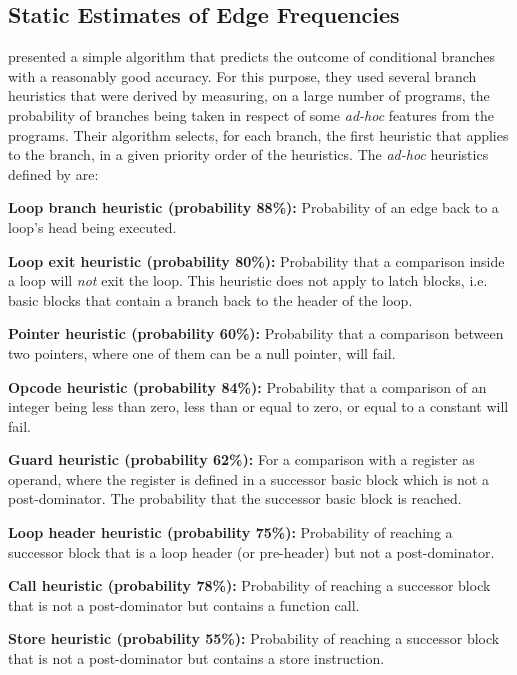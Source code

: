 \subsection{Static Estimates of Edge Frequencies}

\cite{ball93} presented a simple algorithm that predicts the outcome of conditional branches with a reasonably good accuracy.
For this purpose, they used several branch heuristics that were derived by measuring, on a large number of programs, the probability of branches being taken in respect of some \textit{ad-hoc} features from the programs.
Their algorithm selects, for each branch, the first heuristic that applies to the branch, in a given priority order of the heuristics.
The \textit{ad-hoc} heuristics defined by \cite{ball93} are:

\noindent\textbf{Loop branch heuristic (probability 88\%):} Probability of an edge back to a loop's head being executed.

\noindent\textbf{Loop exit heuristic (probability 80\%):} Probability that a comparison inside a loop will \textit{not} exit the loop. This heuristic does not apply to latch blocks, i.e. basic blocks that contain a branch back to the header of the loop.

\noindent\textbf{Pointer heuristic (probability 60\%):} Probability that a comparison between two pointers, where one of them can be a null pointer, will fail.

\noindent\textbf{Opcode heuristic (probability 84\%):} Probability that a comparison of an integer being less than zero, less than or equal to zero, or equal to a constant will fail.

\noindent\textbf{Guard heuristic (probability 62\%):} For a comparison with a register as operand, where the register is defined in a successor basic block which is not a post-dominator. The probability that the successor basic block is reached.

\noindent\textbf{Loop header heuristic (probability 75\%):} Probability of reaching a successor block that is a loop header (or pre-header) but not a post-dominator.

\noindent\textbf{Call heuristic (probability 78\%):} Probability of reaching a successor block that is not a post-dominator but contains a function call.

\noindent\textbf{Store heuristic (probability 55\%):} Probability of reaching a successor block that is not a post-dominator but contains a store instruction.

